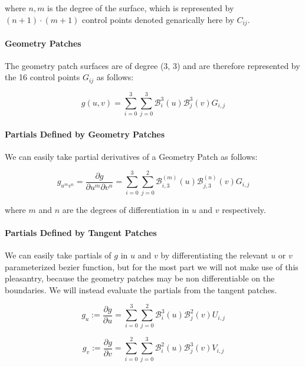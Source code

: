 \documentclass[12pt, letterpaper]{article}
\begin{document}
		where $n, m$ is the degree of the surface, which is represented by $(n + 1) \cdot (m + 1)$ control points denoted genarically here by $C_{ij}$.
		
		\paragraph{Geometry Patches}

		The geometry patch surfaces are of degree (3, 3) and are therefore represented by the 16 control points $G_{ij}$ as follows:
		
		$$g(u, v) = \sum_{i=0}^{3}{\sum_{j=0}^{3}{\mathcal{B}_{i}^{3}(u) \mathcal{B}_{j}^{3}(v) G_{i, j}}}$$
		
		\paragraph{Partials Defined by Geometry Patches}

		We can easily take partial derivatives of a Geometry Patch as follows:

		$$g_{u^{m}v^{n}} = \frac{\partial g}{\partial u^{m} \partial v^{n}} = \sum_{i=0}^{3}{\sum_{j=0}^{2}{\mathcal{B}_{i, 3}^{(m)}(u) \mathcal{B}_{j, 3}^{(n)}(v) G_{i, j}}}$$

		where $m$ and $n$ are the degrees of differentiation in $u$ and $v$ respectively.

		\paragraph{Partials Defined by Tangent Patches}
		
		We can easily take partials of $g$ in $u$ and $v$ by differentiating the relevant $u$ or $v$ parameterized bezier function,
		but for the most part we will not make use of this pleasantry, because the geometry patches may be non differentiable on the boundaries.
		We will instead evaluate the partials from the tangent patches.
		
		\begin{equation} \label{eq:g_u}
		g_{u} := \frac{\partial g}{\partial u} = \sum_{i=0}^{3}{\sum_{j=0}^{2}{\mathcal{B}_{i}^{3}(u) \mathcal{B}_{j}^{2}(v) U_{i, j}}}
		\end{equation}

		\begin{equation} \label{eq:g_v}
		g_{v} := \frac{\partial g}{\partial v} = \sum_{i=0}^{2}{\sum_{j=0}^{3}{\mathcal{B}_{i}^{2}(u) \mathcal{B}_{j}^{3}(v) V_{i, j}}}
		\end{equation}
\end{document}
